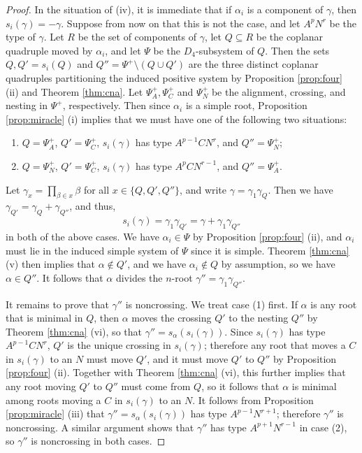 \documentclass[10pt,a4paper]{amsart}
\newcommand{\al}{\alpha}
\newcommand{\se}{\subseteq}
\begin{document}
\begin{proof}
In the situation of (iv), it is immediate that if $\al_i$ is a component of
$\gamma$, then $s_{i}(\gamma) = -\gamma$.  Suppose from now on that this is not
the case, and let $A^pN^r$ be the type of $\gamma$.  Let $R$ be the set of
components of $\gamma$, let $Q\se R$ be the coplanar quadruple moved by
$\al_{i}$, and let $\Psi$ be the $D_4$-subsystem of $Q$. Then the sets $Q,
Q'=s_i(Q)$ and $Q''=\Psi^+\setminus (Q\cup Q')$ are the three distinct coplanar
quadruples partitioning the induced positive system by Proposition
\ref{prop:four} (ii) and Theorem \ref{thm:cna}. Let $\Psi^+_A, \Psi^+_C$ and
$\Psi^+_N$ be the alignment, crossing, and nesting in $\Psi^+$, respectively.
Then since $\al_i$ is a simple root, Proposition \ref{prop:miracle} (i) implies
that we must have one of the following two situations:
\begin{enumerate}
    \item[(1)] $Q=\Psi^+_A$, $Q'=\Psi^+_C$, $s_i(\gamma)$ has type
         $A^{p-1}CN^r$, and $Q''=\Psi^+_N$;
     \item[(2)] $Q=\Psi^+_N$, $Q'=\Psi^+_C$, $s_i(\gamma)$ has type
         $A^pCN^{r-1}$, and $Q''=\Psi^+_A$.
 \end{enumerate} Let $\gamma_x=\prod_{\beta\in x}\beta$ for all $x\in
    \{Q,Q',Q''\}$, and write $\gamma=\gamma_1\gamma_Q$. Then we have
    $\gamma_{Q'}=\gamma_Q+\gamma_{Q''}$, and thus,
    \[s_i(\gamma)=\gamma_1\gamma_{Q'}=\gamma+\gamma_1\gamma_{Q''} \] in both of
    the above cases. We have $\al_i\in \Psi$ by Proposition \ref{prop:four}
    (ii), and $\al_i$ must lie in the induced simple system of $\Psi$ since it
    is simple. Theorem \ref{thm:cna} (v) then implies that $\al\notin Q'$, and
    we have $\al_i\notin Q$ by assumption, so we have $\al\in Q''$. It follows
    that $\al$ divides the $n$-root $\gamma''=\gamma_1\gamma_{Q''}$.

It remains to prove that $\gamma''$ is noncrossing.  We treat case (1) first.
If $\al$ is any root that is minimal in $Q$, then $\al$ moves the crossing $Q'$
to the nesting $Q''$ by Theorem \ref{thm:cna} (vi), so that
$\gamma''=s_\al(s_i(\gamma))$.  Since $s_i(\gamma)$ has type $A^{p-1}CN^r$, $Q'$
is the unique crossing in $s_i(\gamma)$; therefore any root that moves a $C$ in
$s_i(\gamma)$ to an $N$ must move $Q'$, and it must move $Q'$ to $Q''$ by
Proposition \ref{prop:four} (ii). Together with Theorem \ref{thm:cna} (vi), this
further implies that any root moving $Q'$ to $Q''$ must come from $Q$, so it
follows that $\al$ is minimal among roots moving a $C$ in $s_i(\gamma)$ to an
$N$. It follows from Proposition \ref{prop:miracle} (iii) that
$\gamma''=s_\al(s_i(\gamma))$ has type $A^{p-1}N^{r+1}$; therefore $\gamma''$ is
noncrossing. A similar argument shows that $\gamma''$ has type $A^{p+1}N^{r-1}$
in case (2), so $\gamma''$ is noncrossing in both cases.
\end{proof}
\end{document}
